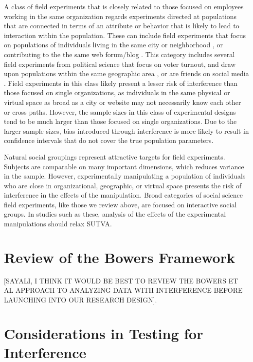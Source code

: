 \documentclass[12pt]{article}
\begin{document}
A class of field experiments that is closely related to those focused on employees working in the same organization regards experiments directed at populations that are connected in terms of an attribute or behavior that is likely to lead to interaction within the population. These can include field experiments that focus on populations of individuals living in the same city or neighborhood \citep[e.g., ][]{costa2013energy}, or contributing to the the same web forum/blog \citep[e.g., ][]{harper2010social}. This category includes several field experiments from political science that focus on voter turnout, and draw upon populations within the same geographic area \citep[e.g., ][]{gerber2000effects,niven2006field}, or are friends on social media \citep[e.g., ][]{Bond:2012}. Field experiments in this class likely present a lesser risk of interference than those focused on single organizations, as individuals in the same physical or virtual space as broad as a city or website may not necessarily know each other or cross paths. However, the sample sizes in this class of experimental designs tend to be much larger than those focused on single organizations. Due to the larger sample sizes, bias introduced through interference is more likely to result in confidence intervals that do not cover the true population parameters.

Natural social groupings represent attractive targets for field experiments. Subjects are comparable on many important dimensions, which reduces variance in the sample. However, experimentally manipulating a population of individuals who are close in organizational, geographic, or virtual space presents the risk of interference in the effects of the manipulation. Broad categories of social science field experiments, like those we review above, are focused on interactive social groups. In studies such as these, analysis of the effects of the experimental manipulations should relax SUTVA.

\section{Review of the Bowers Framework}
[SAYALI, I THINK IT WOULD BE BEST TO REVIEW THE BOWERS ET AL APPROACH TO ANALYZING DATA WITH INTERFERENCE BEFORE LAUNCHING INTO OUR RESEARCH DESIGN].

\section{Considerations in Testing for Interference}
\end{document}
